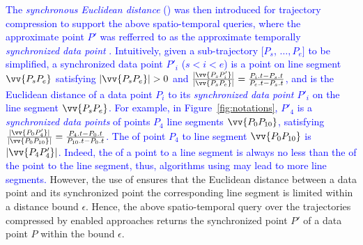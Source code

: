 
\textcolor{blue}{The \emph{synchronous Euclidean distance} (\sed) was then introduced for trajectory compression to support the above spatio-temporal queries, where the approximate point $P'$ was refferred to as the approximate temporally \emph{synchronized data point} \cite{Meratnia:Spatiotemporal}.
}
\textcolor{blue}{Intuitively, given a sub-trajectory $[P_s$, $\ldots, P_e]$ to be simplified, a synchronized data point $P'_i$ ($s<i<e$) is a point on line segment $\vv{P_sP_{e}}$ satisfying $|\vv{P_sP_e}|>0$ and $\frac{|\vv{P_sP'_i}|}{|\vv{P_sP_e}|} = \frac{P_i.t - P_s.t}{P_e.t - P_s.t}$, and \sed is the Euclidean distance of a data point $P_i$ to its \emph{synchronized data point $P'_i$} on the line segment $\vv{P_sP_{e}}$.}
%
\textcolor{blue}{For example, in Figure~\ref{fig:notations}, $P'_4$ is a \emph{synchronized data points} of points $P_4$ \wrt line segments $\vv{P_0P_{10}}$, satisfying $\frac{|\vv{P_0P'_4}|}{|\vv{P_0P_{10}}|} = \frac{P_4.t - P_0.t}{P_{10}.t-P_0.t}$. The \sed of point $P_4$ to line segment $\vv{P_0P_{10}}$ is $|\vv{P_4P'_4}|$.}
%
\textcolor{blue}{Indeed, the \sed of a point to a line segment is always no less than the \ped of the point to the line segment, thus, \lsa algorithms using \sed may lead to more line segments.}
However, the use of \sed ensures that the Euclidean distance between a data point and its synchronized point \wrt the corresponding line segment is limited within a distance bound $\epsilon$. Hence, the above spatio-temporal query over the trajectories compressed by \sed enabled approaches returns the synchronized point $P'$ of a data point $P$ within the bound $\epsilon$.


